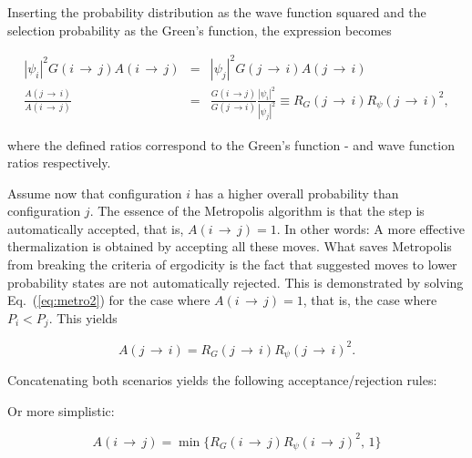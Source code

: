 Inserting the probability distribution as the wave function squared and the selection probability as the Green's function, the expression becomes

\begin{eqnarray}
  \label{eq:metro2}
  |\psi_i|^2G(i\,\rightarrow\,j)A(i\,\rightarrow\,j) &=& |\psi_j|^2G(j\,\rightarrow\,i)A(j\,\rightarrow\,i) \nonumber \\
  \frac{A(j\,\rightarrow\,i)}{A(i\,\rightarrow\,j)} &=& \frac{G(i\,\rightarrow j)}{G(j\,\rightarrow i)}\frac{|\psi_i|^2}{|\psi_j|^2} \equiv R_G(j\,\rightarrow\,i)R_\psi(j\,\rightarrow\,i)^2,
\end{eqnarray}

where the defined ratios correspond to the Green's function - and wave function ratios respectively. 

Assume now that configuration $i$ has a higher overall probability than configuration $j$. The essence of the Metropolis algorithm is that the step is automatically accepted, that is, $A(i\,\rightarrow\,j) = 1$. In other words: A more effective thermalization is obtained by accepting all these moves. What saves Metropolis from breaking the criteria of ergodicity is the fact that suggested moves to lower probability states are not automatically rejected. This is demonstrated by solving Eq.~(\ref{eq:metro2}) for the case where $A(i\,\rightarrow\,j) = 1$, that is, the case where $P_i < P_j$. This yields

\begin{equation*}
 A(j\,\rightarrow\,i) = R_G(j\,\rightarrow\,i)R_\psi(j\,\rightarrow\,i)^2.
\end{equation*}


Concatenating both scenarios yields the following acceptance/rejection rules:


Or more simplistic:

\begin{equation}
  A(i\,\rightarrow\,j) = \min\{R_G(i\,\rightarrow\,j)R_\psi(i\,\rightarrow\,j)^2, \,1\}
\end{equation}


